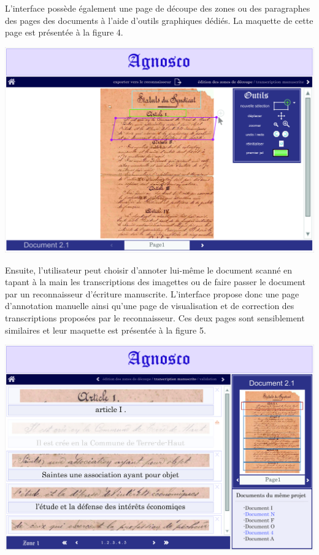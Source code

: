 L'interface possède également une page de découpe des zones ou des paragraphes des pages des documents à l'aide d'outils graphiques dédiés. La maquette de cette page est présentée à la figure 4.

\begin{mdframed}[frametitle={Figure 4 : Maquette de la page de découpe des zones}, innerbottommargin=10]
\begin{center}
\includegraphics[scale=0.04]{assets/maquetteIHMdecoupes.jpg}
\end{center}
\end{mdframed}

Ensuite, l'utilisateur peut choisir d'annoter lui-même le document scanné en tapant à la main les transcriptions des imagettes ou de faire passer le document par un reconnaisseur d'écriture manuscrite. L'interface propose donc une page d'annotation manuelle ainsi qu'une page de visualisation et de correction des transcriptions proposées par le reconnaisseur. Ces deux pages sont sensiblement similaires et leur maquette est présentée à la figure 5.

\begin{mdframed}[frametitle={Figure 5 : Maquette de la page d'annotation manuelle}, innerbottommargin=10]
\begin{center}
\includegraphics[scale=0.04]{assets/maquetteIHMtranscriptionmanu.jpg}
\end{center}
\end{mdframed}

